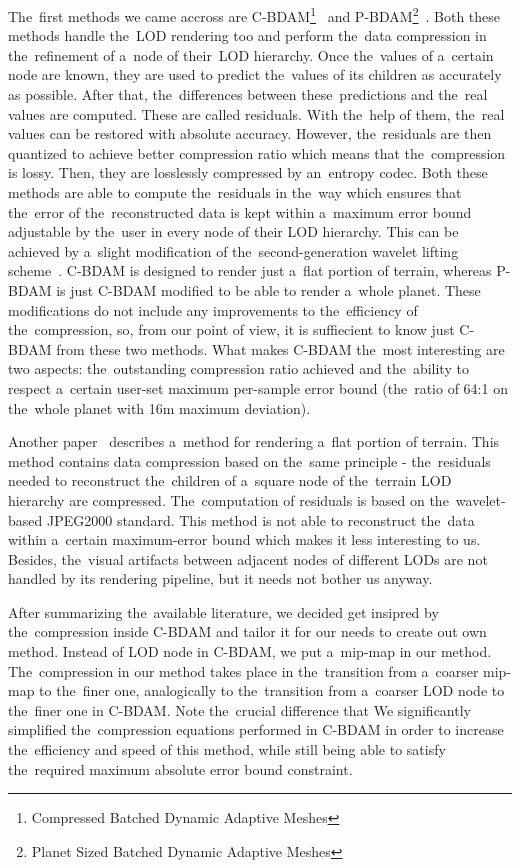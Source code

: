 The~first methods we came accross are C-BDAM\footnote{Compressed Batched Dynamic Adaptive Meshes}~\cite{cbdam} and P-BDAM\footnote{Planet Sized Batched Dynamic Adaptive Meshes}~\cite{pbdam}. Both these methods handle the~LOD rendering too and perform the~data compression in the~refinement of a~node of their~LOD hierarchy. Once the~values of a~certain node are known, they are used to predict the~values of its children as accurately as possible. After that, the~differences between these~predictions and the~real values are computed. These are called residuals. With the~help of them, the~real values can be restored with absolute accuracy. However, the~residuals are then quantized to achieve better compression ratio which means that the~compression is lossy. Then, they are losslessly compressed by an~entropy codec. Both these methods are able to compute the~residuals in the~way which ensures that the~error of the~reconstructed data is kept within a~maximum error bound adjustable by the~user in every node of their LOD hierarchy. This can be achieved by a~slight modification of the~second-generation wavelet lifting scheme~\cite{two-stage}. C-BDAM is designed to render just a~flat portion of terrain, whereas P-BDAM is just C-BDAM modified to be able to render a~whole planet. These modifications do not include any improvements to the~efficiency of the~compression, so, from our point of view, it is suffiecient to know just C-BDAM from these two methods. What makes C-BDAM the~most interesting are two aspects: the~outstanding compression ratio achieved and the~ability to respect a~certain user-set maximum per-sample error bound (the~ratio of 64:1 on the~whole planet with 16m maximum deviation).

Another paper~\cite{jpeg2000terrain} describes a~method for rendering a~flat portion of terrain. This method contains data compression based on the~same principle - the~residuals needed to reconstruct the~children of a~square node of the~terrain LOD hierarchy are compressed. The~computation of residuals is based on the~wavelet-based JPEG2000 standard. This method is not able to reconstruct the~data within a~certain maximum-error bound which makes it less interesting to us. Besides, the~visual artifacts between adjacent nodes of different LODs are not handled by its rendering pipeline, but it needs not bother us anyway.

After summarizing the~available literature, we decided get insipred by the~compression inside C-BDAM and tailor it for our needs to create out own method. Instead of LOD node in C-BDAM, we put a~mip-map in our method. The~compression in our method takes place in the~transition from a~coarser mip-map to the~finer one, analogically to the~transition from a~coarser LOD node to the~finer one in C-BDAM. Note the~crucial difference that We significantly simplified the~compression equations performed in C-BDAM in order to increase the~efficiency and speed of this method, while still being able to satisfy the~required maximum absolute error bound constraint.

